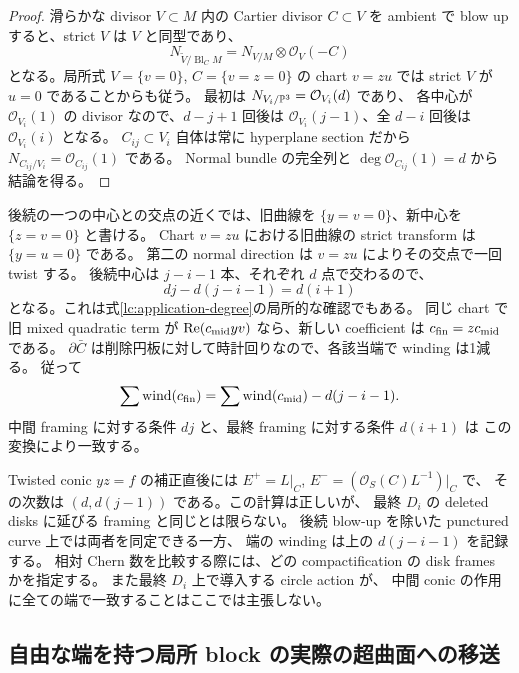 \begin{proof}
滑らかな divisor $V\subset M$ 内の Cartier divisor $C\subset V$ を ambient で
blow up すると、strict $V$ は $V$ と同型であり、
\[
N_{\widetilde V/\operatorname{Bl}_C M}=N_{V/M}\otimes\mathcal O_V(-C)
\]
となる。局所式 $V=\{v=0\}$, $C=\{v=z=0\}$ の chart $v=zu$ では
strict $V$ が $u=0$ であることからも従う。
最初は $N_{V_i/\mathbb P^3}=\mathcal O_{V_i}(d)$ であり、
各中心が $\mathcal O_{V_i}(1)$ の divisor なので、$d-j+1$ 回後は
$\mathcal O_{V_i}(j-1)$、全 $d-i$ 回後は $\mathcal O_{V_i}(i)$ となる。
$C_{ij}\subset V_i$ 自体は常に hyperplane section だから
$N_{C_{ij}/V_i}=\mathcal O_{C_{ij}}(1)$ である。
Normal bundle の完全列と $\deg\mathcal O_{C_{ij}}(1)=d$ から結論を得る。
\end{proof}

後続の一つの中心との交点の近くでは、旧曲線を
$\{y=v=0\}$、新中心を $\{z=v=0\}$ と書ける。
Chart $v=zu$ における旧曲線の strict transform は $\{y=u=0\}$ である。
第二の normal direction は $v=zu$ によりその交点で一回 twist する。
後続中心は $j-i-1$ 本、それぞれ $d$ 点で交わるので、
\[
dj-d(j-i-1)=d(i+1)
\]
となる。これは式\eqref{lc:application-degree}の局所的な確認でもある。
同じ chart で旧 mixed quadratic term が
$\operatorname{Re}(c_{\rm mid}yv)$ なら、新しい coefficient は
$c_{\rm fin}=z c_{\rm mid}$ である。
$\partial\bar C$ は削除円板に対して時計回りなので、各該当端で winding は1減る。
従って
\[
\sum\operatorname{wind}(c_{\rm fin})
=\sum\operatorname{wind}(c_{\rm mid})-d(j-i-1).
\]
中間 framing に対する条件 $dj$ と、最終 framing に対する条件 $d(i+1)$ は
この変換により一致する。

\begin{remark}\label{lc:application-frames}
Twisted conic $yz=f$ の補正直後には
$E^+=L|_C$, $E^-=(\mathcal O_S(C)L^{-1})|_C$ で、
その次数は $(d,d(j-1))$ である。この計算は正しいが、
最終 $D_i$ の deleted disks に延びる framing と同じとは限らない。
後続 blow-up を除いた punctured curve 上では両者を同定できる一方、
端の winding は上の $d(j-i-1)$ を記録する。
相対 Chern 数を比較する際には、どの compactification の disk frames かを指定する。
また最終 $D_i$ 上で導入する circle action が、
中間 conic の作用に全ての端で一致することはここでは主張しない。
\end{remark}

\subsection{自由な端を持つ局所 block の実際の超曲面への移送}

